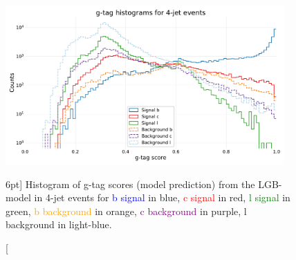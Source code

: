 \documentclass[a4paper, twoside]{tufte-book}
\begin{document}
\begin{figure}
  \includegraphics[width=0.95\textwidth, trim=10 10 10 40, clip]{figures/quarks/gtag-histogram-sigbkg-down_sample=1.00-ML_vars=vertex-selection=b-ejet_min=4-n_iter_RS_lgb=99-n_iter_RS_xgb=9-cdot_cut=0.90-version=19-njet=4.pdf}
  \caption[g-tag scores in 4-jet events for signal and background][6pt]
          {Histogram of g-tag scores (model prediction) from the LGB-model in 4-jet events for \textcolor{blue}{b signal} in blue, \textcolor{red}{c signal} in red, \textcolor{green}{l signal} in green, \textcolor{orange}{b background} in orange, \textcolor{purple}{c background} in purple, \textcolor{light-blue}{l background} in light-blue.
          } 
  \label{fig:q:gtag_scores_4j_sig_bkg}
\end{figure}
\end{document}
